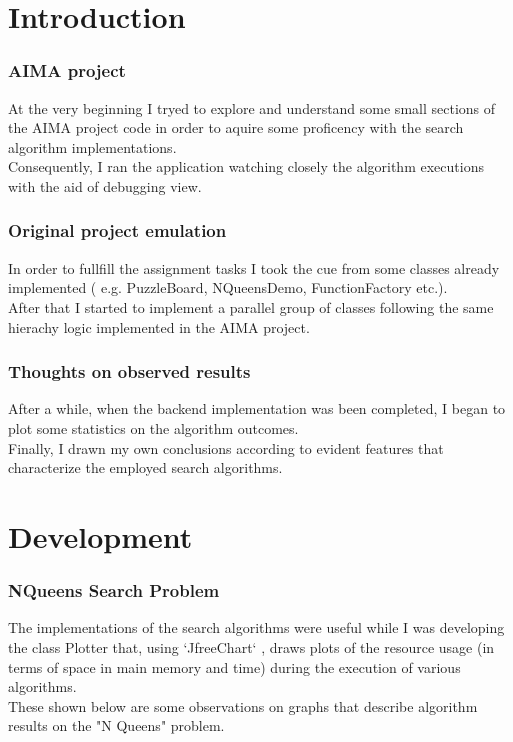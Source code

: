 \documentclass{article}
\begin{document}
			\renewcommand{\lstlistingname}{Code}

			
			\part{Introduction}
			
				\section{AIMA project}
At the very beginning I tryed to explore and understand some small sections of the AIMA project code in order to aquire some proficency with the search algorithm implementations.\medskip\\
 Consequently, I  ran the application watching closely the algorithm executions with the aid of debugging view.
				\section{Original project emulation}
In order to fullfill the assignment tasks I took the cue from some classes already implemented ( e.g. PuzzleBoard, NQueensDemo, FunctionFactory etc.).\medskip\\
After that I started to implement a parallel group of classes following the same hierachy logic implemented in the AIMA project.
				\section{Thoughts on observed results}
After a while, when the backend implementation was been completed, I began to plot some statistics on the algorithm outcomes.\medskip\\
Finally, I drawn my own conclusions according to evident features that characterize the employed search algorithms.
\newpage
			\part{Development}
				\section{NQueens Search Problem}
	The implementations of the search algorithms were useful while I was developing the class Plotter that, using `JfreeChart` , draws plots of the resource usage (in terms of space in main memory and time) during the execution of various algorithms.\medskip\\
These shown below are some observations on graphs that describe algorithm results on the "N Queens" problem.
\end{document}
